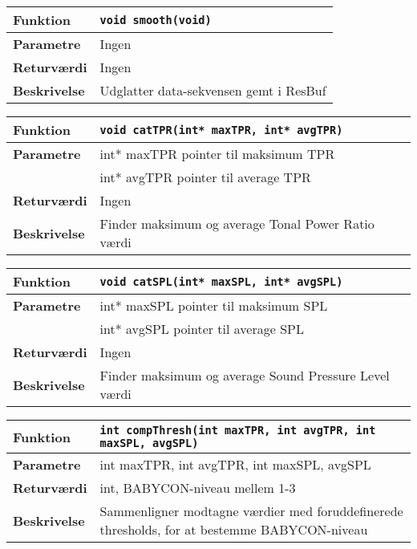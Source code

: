 \begin{center}
    \begin{tabular}{ | l | p{} |}
    \hline
    \textbf{Funktion}	& \verb+void smooth(void) +						\\ \hline
    \textbf{Parametre} 	& Ingen		\\ \hline
    \textbf{Returværdi}	& Ingen	 								\\ \hline
    \textbf{Beskrivelse}& Udglatter data-sekvensen gemt i ResBuf		\\ \hline
    \end{tabular}
\end{center}

\begin{center}
    \begin{tabular}{ | l | p{} |}
    \hline
    \textbf{Funktion}	& \verb+void catTPR(int* maxTPR, int* avgTPR) +						\\ \hline
    \textbf{Parametre} 	& int* maxTPR pointer til maksimum TPR\\&
    						  int* avgTPR pointer til average TPR			\\ \hline
    \textbf{Returværdi}	& Ingen	 								\\ \hline
    \textbf{Beskrivelse}& Finder maksimum og average Tonal Power Ratio værdi		\\ \hline
    \end{tabular}
\end{center}

\begin{center}
    \begin{tabular}{ | l | p{} |}
    \hline
    \textbf{Funktion}	& \verb+void catSPL(int* maxSPL, int* avgSPL) +						\\ \hline
    \textbf{Parametre} 	& int* maxSPL pointer til maksimum SPL\\&
    						  int* avgSPL pointer til average SPL			\\ \hline
    \textbf{Returværdi}	& Ingen	 								\\ \hline
    \textbf{Beskrivelse}& Finder maksimum og average Sound Pressure Level værdi		\\ \hline
    \end{tabular}
\end{center}

\begin{center}
    \begin{tabular}{ | l | p{} |}
    \hline
    \textbf{Funktion}	& \verb+int compThresh(int maxTPR, int avgTPR, int maxSPL, avgSPL) +						\\ \hline
    \textbf{Parametre} 	& int maxTPR, int avgTPR, int maxSPL, avgSPL			\\ \hline
    \textbf{Returværdi}	& int, BABYCON-niveau mellem 1-3 								\\ \hline
    \textbf{Beskrivelse}& Sammenligner modtagne værdier med foruddefinerede thresholds, for at bestemme BABYCON-niveau		\\ \hline
    \end{tabular}
\end{center}


